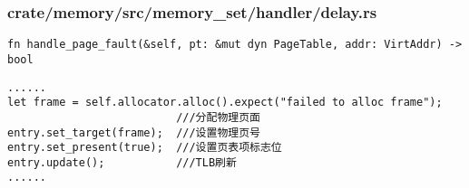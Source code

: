 % 
% 
\begin{frame}   
	\frametitle{crate/memory/src/memory\_set/handler/delay.rs}
\begin{verbatim}
fn handle_page_fault(&self, pt: &mut dyn PageTable, addr: VirtAddr) -> bool
\end{verbatim}
\begin{block}{}
\begin{verbatim}
......
let frame = self.allocator.alloc().expect("failed to alloc frame");
                          ///分配物理页面
entry.set_target(frame);  ///设置物理页号
entry.set_present(true);  ///设置页表项标志位
entry.update();           ///TLB刷新
......
\end{verbatim}
\end{block}
\end{frame}

